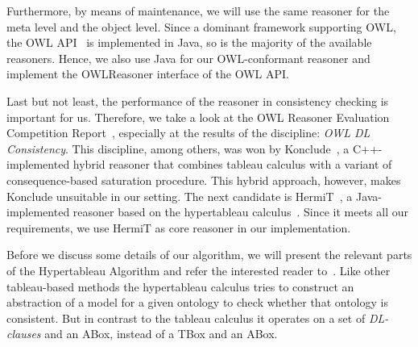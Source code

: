 Furthermore, by means of maintenance, we will use the same reasoner for the meta level and the
object level.
%
Since a dominant framework supporting OWL, the OWL API~\cite{HoB-SW11} is implemented in Java, so is the
majority of the available reasoners. Hence, we also use Java for our OWL-conformant reasoner and
implement the \textsf{OWLReasoner} interface of the OWL API.

Last but not least, the performance of the reasoner in consistency checking is important for us. Therefore, 
we take a look at the OWL Reasoner Evaluation Competition Report~\cite{PaMGGS-SSWS15}, especially at
the results of the discipline: \emph{OWL DL Consistency}. This discipline, among others, was won by
Konclude~\cite{StLG-JWS14}, a C++-implemented hybrid reasoner that combines tableau calculus with a
variant of consequence-based saturation procedure. This hybrid approach, however, makes Konclude
unsuitable in our setting. The next candidate is HermiT~\cite{GHM-JAR14}, a Java-implemented
reasoner based on the hypertableau calculus~\cite{MoSH-JAIR09}. Since it meets all our
requirements, we use HermiT as core reasoner in our implementation.





Before we discuss some details of our algorithm, we will present the relevant parts of the
Hypertableau Algorithm and refer the interested reader
to~\cite{MoSH-CADE07,MoSH-DL07,MoSH-JAIR09}. Like other tableau-based methods the hypertableau
calculus tries to construct an abstraction of a model for a given ontology to check whether that
ontology is consistent. But in contrast to the tableau calculus it operates on a set of
\emph{DL-clauses} and an ABox, instead of a TBox and an ABox. 

\begin{definition}
  \mbox{ }

\end{definition}

